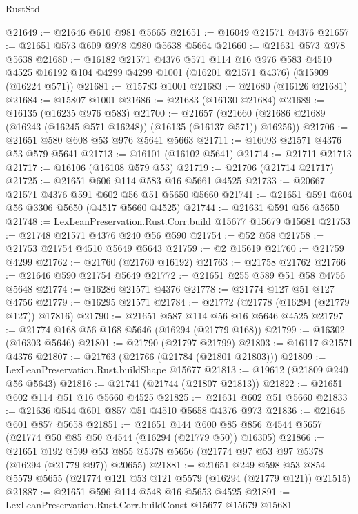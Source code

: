 \begin{lexlean}{RustStd}
\begin{coremodule}
@21649 := @21646 @610 @981 @5665
@21651 := @16049 @21571 @4376
@21657 := @21651 @573 @609 @978 @980 @5638 @5664
@21660 := @21631 @573 @978 @5638
@21680 := @16182
    @21571
    @4376
    @571
    @114
    @16
    @976
    @583
    @4510
    @4525
    @16192
    @104
    @4299
    @4299
    @1001
    (@16201 @21571 @4376)
    (@15909 (@16224 @571))
@21681 := @15783 @1001
@21683 := @21680 (@16126 @21681)
@21684 := @15807 @1001
@21686 := @21683 (@16130 @21684)
@21689 := @16135 (@16235 @976 @583)
@21700 := @21657
    (@21660 (@21686 @21689 (@16243 (@16245 @571 @16248)) (@16135 (@16137 @571)) @16256))
@21706 := @21651 @580 @608 @53 @976 @5641 @5663
@21711 := @16093 @21571 @4376 @53 @579 @5641
@21713 := @16101 (@16102 @5641)
@21714 := @21711 @21713
@21717 := @16106 (@16108 @579 @53)
@21719 := @21706 (@21714 @21717)
@21725 := @21651 @606 @114 @583 @16 @5661 @4525
@21733 := @20667 @21571 @4376 @591 @602 @56 @51 @5650 @5660
@21741 := @21651 @591 @604 @56 @3306 @5650 (@4517 @5660 @4525)
@21744 := @21631 @591 @56 @5650
@21748 := LexLeanPreservation.Rust.Corr.build @15677 @15679 @15681
@21753 := @21748 @21571 @4376 @240 @56 @590
@21754 := @52 @58
@21758 := @21753 @21754 @4510 @5649 @5643
@21759 := @2 @15619
@21760 := @21759 @4299
@21762 := @21760 (@21760 @16192)
@21763 := @21758 @21762
@21766 := @21646 @590 @21754 @5649
@21772 := @21651 @255 @589 @51 @58 @4756 @5648
@21774 := @16286 @21571 @4376
@21778 := @21774 @127 @51 @127 @4756
@21779 := @16295 @21571
@21784 := @21772 (@21778 (@16294 (@21779 @127)) @17816)
@21790 := @21651 @587 @114 @56 @16 @5646 @4525
@21797 := @21774 @168 @56 @168 @5646 (@16294 (@21779 @168))
@21799 := @16302 (@16303 @5646)
@21801 := @21790 (@21797 @21799)
@21803 := @16117 @21571 @4376
@21807 := @21763 (@21766 (@21784 (@21801 @21803)))
@21809 := LexLeanPreservation.Rust.buildShape @15677
@21813 := @19612 (@21809 @240 @56 @5643)
@21816 := @21741 (@21744 (@21807 @21813))
@21822 := @21651 @602 @114 @51 @16 @5660 @4525
@21825 := @21631 @602 @51 @5660
@21833 := @21636 @544 @601 @857 @51 @4510 @5658 @4376 @973
@21836 := @21646 @601 @857 @5658
@21851 := @21651
    @144
    @600
    @85
    @856
    @4544
    @5657
    (@21774 @50 @85 @50 @4544 (@16294 (@21779 @50)) @16305)
@21866 := @21651
    @192
    @599
    @53
    @855
    @5378
    @5656
    (@21774 @97 @53 @97 @5378 (@16294 (@21779 @97)) @20655)
@21881 := @21651
    @249
    @598
    @53
    @854
    @5579
    @5655
    (@21774 @121 @53 @121 @5579 (@16294 (@21779 @121)) @21515)
@21887 := @21651 @596 @114 @548 @16 @5653 @4525
@21891 := LexLeanPreservation.Rust.Corr.buildConst @15677 @15679 @15681

\end{coremodule}
\end{lexlean}
